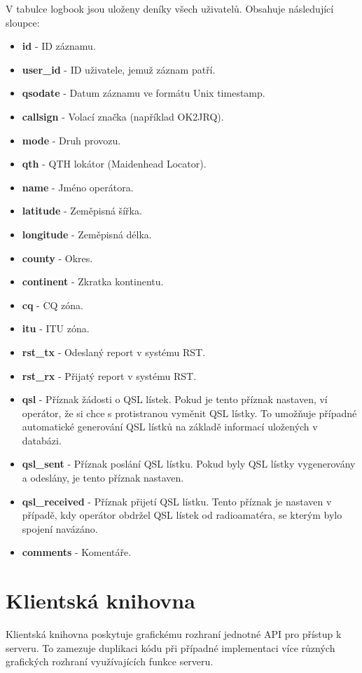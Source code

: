 V tabulce logbook jsou uloženy deníky všech uživatelů. Obsahuje následující sloupce:

\begin{itemize}
\item \textbf{id} - ID záznamu.
\item \textbf{user\_id} - ID uživatele, jemuž záznam patří.
\item \textbf{qsodate} - Datum záznamu ve formátu Unix timestamp.
\item \textbf{callsign} - Volací značka (například OK2JRQ).
\item \textbf{mode} - Druh provozu. %
\item \textbf{qth} - QTH lokátor (Maidenhead Locator).
\item \textbf{name} - Jméno operátora.
\item \textbf{latitude} - Zeměpisná šířka.
\item \textbf{longitude} - Zeměpisná délka.
\item \textbf{county} - Okres.
\item \textbf{continent} - Zkratka kontinentu.
\item \textbf{cq} - CQ zóna.
\item \textbf{itu} - ITU zóna.
\item \textbf{rst\_tx} - Odeslaný report v systému RST.
\item \textbf{rst\_rx} - Přijatý report v systému RST.
\item \textbf{qsl} - Příznak žádosti o QSL lístek. Pokud je tento příznak nastaven, ví operátor, že si chce
s protistranou vyměnit QSL lístky. To umožňuje případné automatické generování QSL lístků na základě informací
uložených v databázi.
\item \textbf{qsl\_sent} - Příznak poslání QSL lístku. Pokud byly QSL lístky vygenerovány a odeslány, je tento
příznak nastaven.
\item \textbf{qsl\_received} - Příznak přijetí QSL lístku. Tento příznak je nastaven v případě, kdy operátor
obdržel QSL lístek od radioamatéra, se kterým bylo spojení navázáno.
\item \textbf{comments} - Komentáře.
\end{itemize}

\section{Klientská knihovna}
\label{navrh_knihovna}

Klientská knihovna poskytuje grafickému rozhraní jednotné API pro přístup k
serveru. To zamezuje duplikaci kódu při případné implementaci více
různých grafických rozhraní využívajících funkce serveru.

